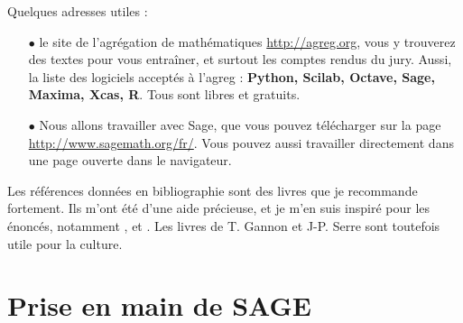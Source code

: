 Quelques adresses utiles :
\begin{itemize}
\item[$\bullet$]le site de l'agrégation de mathématiques \url{http://agreg.org}, vous y trouverez des textes pour vous entraîner, et surtout les comptes rendus du jury. Aussi, la liste des logiciels acceptés à l'agreg : \textbf{Python, Scilab, Octave, Sage, Maxima, Xcas, R}. Tous sont libres et gratuits.
\item[$\bullet$]Nous allons travailler avec Sage, que vous pouvez télécharger sur la page \url{http://www.sagemath.org/fr/}. Vous pouvez aussi travailler directement dans une page ouverte dans le navigateur.
\end{itemize}

Les références données en bibliographie sont des livres que je recommande fortement. Ils m'ont été d'une aide précieuse, et je m'en suis inspiré pour les énoncés, notamment \cite{berhuy},\cite{demazure} et \cite{hindry}. Les livres de T. Gannon \cite{gannon} et J-P. Serre \cite{serre} sont toutefois utile pour la culture. \\

\section{Prise en main de SAGE}

